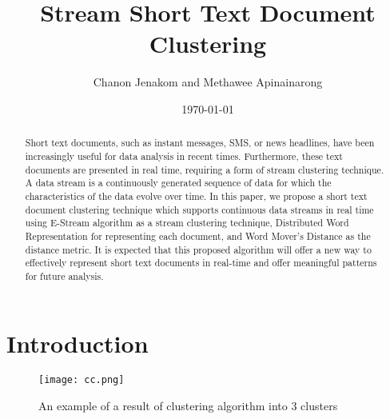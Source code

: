 \documentclass{IEEEtran}
\begin{document}
\title{\textbf{Stream Short Text Document Clustering}}
\author{Chanon Jenakom and Methawee Apinainarong}
\date{\today}
\maketitle

\begin{abstract}
Short text documents, such as instant messages, SMS, or news headlines, have been increasingly useful for data analysis in recent times. Furthermore, these text documents are presented in real time, requiring a form of stream clustering technique. A data stream is a continuously generated sequence of data for which the characteristics of the data evolve over time. In this paper, we propose a short text document clustering technique which supports continuous data streams in real time using E-Stream algorithm as a stream clustering technique, Distributed Word Representation for representing each document, and Word Mover's Distance as the distance metric. It is expected that this proposed algorithm will offer a new way to effectively represent short text documents in real-time and offer meaningful patterns for future analysis.
\end{abstract}


\section{Introduction}


\begin{figure}[hp]
\centering
\texttt{[image: cc.png]}
\caption{An example of a result of clustering algorithm into 3 clusters}
\label{fig:cc1}
\end{figure}
\end{document}

